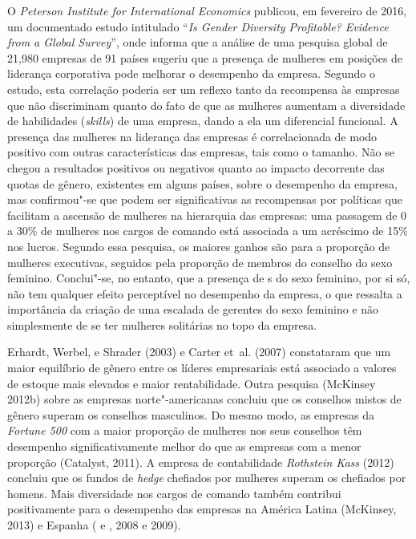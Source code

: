 O \emph{Peterson Institute for International Economics} publicou, em
fevereiro de 2016, um documentado estudo intitulado ``\emph{Is Gender
Diversity Profitable? Evidence from a Global Survey}'', onde informa que
a análise de uma pesquisa global de 21,980 empresas de 91 países sugeriu
que a presença de mulheres em posições de liderança corporativa pode
melhorar o desempenho da empresa. Segundo o estudo, esta correlação
poderia ser um reflexo tanto da recompensa às empresas que não
discriminam quanto do fato de que as mulheres aumentam a diversidade de
habilidades (\emph{skills}) de uma empresa, dando a ela um diferencial
funcional. A presença das mulheres na liderança das empresas é
correlacionada de modo positivo com outras características das empresas,
tais como o tamanho. Não se chegou a resultados positivos ou negativos
quanto ao impacto decorrente das quotas de gênero, existentes em alguns
países, sobre o desempenho da empresa, mas confirmou"-se que podem ser
significativas as recompensas por políticas que facilitam a ascensão de
mulheres na hierarquia das empresas: uma passagem de 0 a 30\% de
mulheres nos cargos de comando está associada a um acréscimo de 15\% nos
lucros. Segundo essa pesquisa, os maiores ganhos são para a proporção de
mulheres executivas, seguidos pela proporção de membros do conselho do
sexo feminino. Conclui"-se, no entanto, que a presença de s do sexo
feminino, por si só, não tem qualquer efeito perceptível no desempenho
da empresa, o que ressalta a importância da criação de uma escalada de
gerentes do sexo feminino e não simplesmente de se ter mulheres
solitárias no topo da empresa.

Erhardt, Werbel, e Shrader (2003) e Carter et~al. (2007) constataram que
um maior equilíbrio de gênero entre os líderes empresariais está
associado a valores de estoque mais elevados e maior rentabilidade.
Outra pesquisa (McKinsey 2012b) sobre as empresas norte"-americanas
concluiu que os conselhos mistos de gênero superam os conselhos
masculinos. Do mesmo modo, as empresas da \emph{Fortune 500} com a maior
proporção de mulheres nos seus conselhos têm desempenho
significativamente melhor do que as empresas com a menor proporção
(Catalyst, 2011). A empresa de contabilidade \emph{Rothstein Kass}
(2012) concluiu que os fundos de \emph{hedge} chefiados por mulheres
superam os chefiados por homens. Mais diversidade nos cargos de comando
também contribui positivamente para o desempenho das empresas na América
Latina (McKinsey, 2013) e Espanha ( e , 2008 e
2009).

